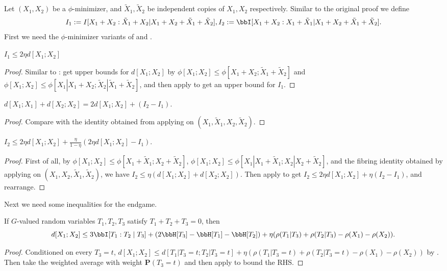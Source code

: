 Let $(X_1, X_2)$ be a $\phi$-minimizer, and $\tilde X_1, \tilde X_2$ be independent copies of $X_1,X_2$ respectively.
Similar to the original proof we define
$$ I_1 :=  I [X_1+X_2 : \tilde X_1 + X_2 | X_1+X_2+\tilde X_1+\tilde X_2], I_2 := \bbI[X_1+X_2 : X_1 + \tilde X_1 | X_1+X_2+\tilde X_1+\tilde X_2].$$
First we need the $\phi$-minimizer variants of  and .
\begin{lemma}\label{phi-first-estimate}
$I_1\le 2\eta d[X_1;X_2]$
\end{lemma}
\begin{proof}
Similar to : get upper bounds for $d[X_1;X_2]$ by $\phi[X_1;X_2]\le \phi[X_1+X_2;\tilde X_1+\tilde X_2]$ and $\phi[X_1;X_2]\le \phi[X_1|X_1+X_2;\tilde X_2|\tilde X_1+\tilde X_2]$, and then apply  to get an upper bound for $I_1$.
\end{proof}

\begin{lemma}\label{I1-I2-diff}
  $d[X_1;X_1]+d[X_2;X_2]= 2d[X_1;X_2]+(I_2-I_1)$.
\end{lemma}
\begin{proof}
Compare  with the identity obtained from applying  on $(X_1,\tilde X_1, X_2, \tilde X_2)$.
\end{proof}

\begin{lemma}\label{phi-second-estimate}
$I_2\le 2\eta d[X_1;X_2] + \frac{\eta}{1-\eta}(2\eta d[X_1;X_2]-I_1)$.
\end{lemma}
\begin{proof}
First of all, by $\phi[X_1;X_2]\le \phi[X_1+\tilde X_1;X_2+\tilde X_2]$, $\phi[X_1;X_2]\le \phi[X_1|X_1+\tilde X_1;X_2|X_2+\tilde X_2]$, and the fibring identity obtained by applying  on $(X_1,X_2,\tilde X_1,\tilde X_2)$,
we have $I_2\le \eta (d[X_1;X_2]+d[X_2;X_2])$. Then apply  to get $I_2\le 2\eta d[X_1;X_2] +\eta(I_2-I_1)$, and rearrange.
\end{proof}


Next we need some inequalities for the endgame.
\begin{lemma}\label{rho-BSG-triplet}
  If $G$-valued random variables $T_1,T_2,T_3$ satisfy $T_1+T_2+T_3=0$, then
  $$d[X_1;X_2]\le 3\bbI[T_1:T_2\mid T_3] + (2\bbH[T_3]-\bbH[T_1]-\bbH[T_2])+ \eta(\rho(T_1|T_3)+\rho(T_2|T_3)-\rho(X_1)-\rho(X_2)).$$
\end{lemma}
\begin{proof}
  Conditioned on every $T_3=t$, $d[X_1;X_2]\le d[T_1|T_3=t;T_2|T_3=t]+\eta(\rho(T_1|T_3=t)+\rho(T_2|T_3=t)-\rho(X_1)-\rho(X_2))$ by . Then take the weighted average with weight $\mathbf{P}(T_3=t)$ and then apply  to bound the RHS.
\end{proof}

